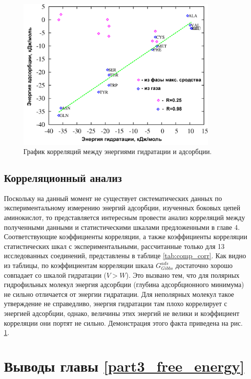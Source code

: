 \begin{figure}
\centering
\includegraphics[width=10cm]{cor_ads_hydr_affin}
\caption{\label{cor_ads_hydr_affin} График корреляций между энергиями гидратации и адсорбции.}
\end{figure}


\subsection{\label{sec:comp_correl}Корреляционный анализ }
Поскольку на данный момент не существует систематических данных по экспериментальному измерению энергий адсорбции, изученных боковых цепей аминокислот, то представляется интересным провести анализ корреляций между полученными данными и статистическими шкалами предложенными в главе 4. Соответствующие коэффициенты корреляции, а также коэффициенты корреляции статистических шкал с экспериментальными, рассчитанные только для 13 исследованных соединений, представлены в таблице \ref{tab:comp_corr}. Как видно из таблицы, по коэффициентам корреляции шкала $G_{Gibbs}^{ads}$ достаточно хорошо совпадает со шкалой гидратации ($V>W$). Это вызвано тем, что для полярных гидрофильных молекул энергия адсорбции (глубина адсорбционного минимума) не сильно отличается от энергии гидратации. Для неполярных молекул такое утверждение не справедливо, энергия гидратации там плохо коррелирует с энергией адсорбции, однако, величины этих энергий не велики и коэффициент корреляции они портят не сильно. Демонстрация этого факта приведена на рис. \ref{cor_ads_hydr_affin}.



\section{Выводы главы \ref{part3_free_energy}}

